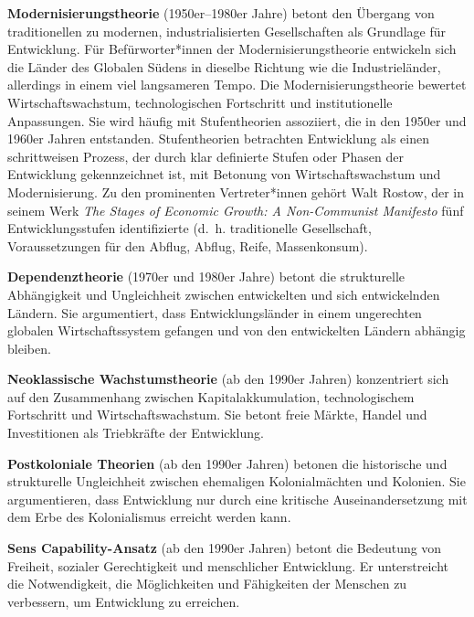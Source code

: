 \documentclass[
  nswissgerman,
  a4paper,
  DIV=11,
  numbers=noendperiod,
  oneside,
  openany]{scrreprt}
\begin{document}
\endgroup{}

\begin{tcolorbox}[enhanced jigsaw, arc=.35mm, bottomrule=.15mm, bottomtitle=1mm, breakable, colback=white, colbacktitle=quarto-callout-note-color!10!white, colframe=quarto-callout-note-color-frame, coltitle=black, left=2mm, leftrule=.75mm, opacityback=0, opacitybacktitle=0.6, rightrule=.15mm, title={Entwicklungstheorien}, titlerule=0mm, toprule=.15mm, toptitle=1mm]

\textbf{Modernisierungstheorie} (1950er--1980er Jahre) betont den
Übergang von traditionellen zu modernen, industrialisierten
Gesellschaften als Grundlage für Entwicklung. Für Befürworter*innen der
Modernisierungstheorie entwickeln sich die Länder des Globalen Südens in
dieselbe Richtung wie die Industrieländer, allerdings in einem viel
langsameren Tempo. Die Modernisierungstheorie bewertet
Wirtschaftswachstum, technologischen Fortschritt und institutionelle
Anpassungen. Sie wird häufig mit Stufentheorien assoziiert, die in den
1950er und 1960er Jahren entstanden. Stufentheorien betrachten
Entwicklung als einen schrittweisen Prozess, der durch klar definierte
Stufen oder Phasen der Entwicklung gekennzeichnet ist, mit Betonung von
Wirtschaftswachstum und Modernisierung. Zu den prominenten
Vertreter*innen gehört Walt Rostow, der in seinem Werk \emph{The Stages
of Economic Growth: A Non-Communist Manifesto} fünf Entwicklungsstufen
identifizierte (d.~h. traditionelle Gesellschaft, Voraussetzungen für
den Abflug, Abflug, Reife, Massenkonsum).

\textbf{Dependenztheorie} (1970er und 1980er Jahre) betont die
strukturelle Abhängigkeit und Ungleichheit zwischen entwickelten und
sich entwickelnden Ländern. Sie argumentiert, dass Entwicklungsländer in
einem ungerechten globalen Wirtschaftssystem gefangen und von den
entwickelten Ländern abhängig bleiben.

\textbf{Neoklassische Wachstumstheorie} (ab den 1990er Jahren)
konzentriert sich auf den Zusammenhang zwischen Kapitalakkumulation,
technologischem Fortschritt und Wirtschaftswachstum. Sie betont freie
Märkte, Handel und Investitionen als Triebkräfte der Entwicklung.

\textbf{Postkoloniale Theorien} (ab den 1990er Jahren) betonen die
historische und strukturelle Ungleichheit zwischen ehemaligen
Kolonialmächten und Kolonien. Sie argumentieren, dass Entwicklung nur
durch eine kritische Auseinandersetzung mit dem Erbe des Kolonialismus
erreicht werden kann.

\textbf{Sens Capability-Ansatz} (ab den 1990er Jahren) betont die
Bedeutung von Freiheit, sozialer Gerechtigkeit und menschlicher
Entwicklung. Er unterstreicht die Notwendigkeit, die Möglichkeiten und
Fähigkeiten der Menschen zu verbessern, um Entwicklung zu erreichen.


\end{tcolorbox}
\end{document}
